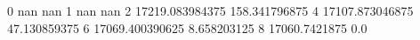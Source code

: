 0 nan nan
1 nan nan
2 17219.083984375 158.341796875
4 17107.873046875 47.130859375
6 17069.400390625 8.658203125
8 17060.7421875 0.0
